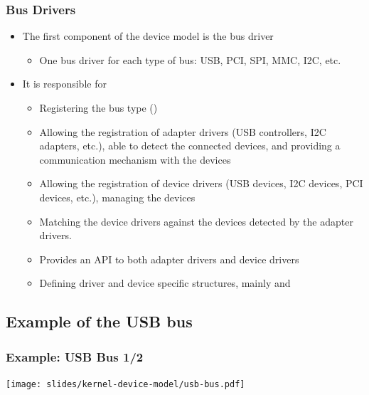 \begin{frame}
  \frametitle{Bus Drivers}
  \begin{itemize}
  \item The first component of the device model is the bus driver
    \begin{itemize}
    \item One bus driver for each type of bus: USB, PCI, SPI, MMC,
      I2C, etc.
    \end{itemize}
  \item It is responsible for
    \begin{itemize}
    \item Registering the bus type ()
    \item Allowing the registration of adapter drivers (USB
      controllers, I2C adapters, etc.), able to detect the
      connected devices, and providing a communication mechanism with
      the devices
    \item Allowing the registration of device drivers (USB devices,
      I2C devices, PCI devices, etc.), managing the devices
    \item Matching the device drivers against the devices detected by
      the adapter drivers.
    \item Provides an API to both adapter drivers and device drivers
    \item Defining driver and device specific structures, mainly
       and 
    \end{itemize}
  \end{itemize}
\end{frame}

\subsection{Example of the USB bus}

\begin{frame}
\frametitle{Example: USB Bus 1/2}
  \begin{center}
    \texttt{[image: slides/kernel-device-model/usb-bus.pdf]}
  \end{center}
\end{frame}

